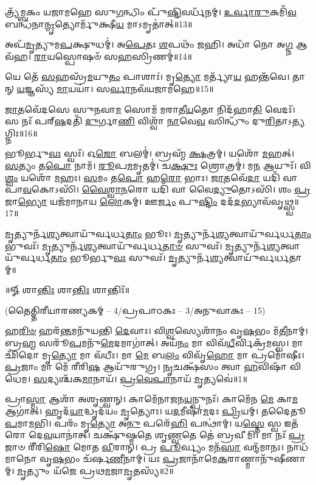 𑌤𑍍𑌰𑍍𑌯᳴𑌮𑍍𑌬𑌕𑌂 𑌯𑌜𑌾𑌮𑌹𑍇 𑌸𑍁\-\ul{𑌗}\-𑌨𑍍𑌧𑌿𑌂 𑌪𑍁᳴\-\ul{𑌷𑍍𑌟𑌿}\-𑌵𑌰𑍍𑌧᳴𑌨𑌮𑍍।
 \ul{𑌉}\-\-\ul{𑌰𑍍𑌵𑌾}\-\-\ul{𑌰𑍁}\-𑌕𑌮𑌿᳴\-\ul{𑌵} 𑌬𑌨𑍍𑌧᳴𑌨𑌾\-\ul{𑌨𑍍𑌮𑍃}\-𑌤𑍍𑌯𑍋𑌰𑍍𑌮𑍁᳴𑌕𑍍𑌷𑍀\-\ul{𑌯} 𑌮𑌾𑌽𑌮𑍃𑌤𑌾॑𑌤𑍍॥13॥

𑌅𑌪᳴\-\ul{𑌮𑍃}\-𑌤𑍍𑌯𑍁𑌮\-\ul{𑌪}\-𑌕𑍍𑌷𑍁𑌧𑌮𑍍॑।   𑌅\-\ul{𑌪𑍇}\-𑌤𑌃 \ul{𑌶}\-𑌪𑌥𑌂᳴ 𑌜𑌹𑌿।
𑌅𑌧𑌾᳴ 𑌨𑍋 𑌅\-\ul{𑌗𑍍𑌨} 𑌆𑌵᳴𑌹।   \ul{𑌰𑌾}\-𑌯𑌸𑍍𑌪𑍋𑌷𑍞᳴ 𑌸\-\ul{𑌹}\-𑌸𑍍𑌰𑌿𑌣𑌮𑍍॑॥14॥

𑌯𑍇 𑌤𑍇᳴ \ul{𑌸}\-𑌹𑌸𑍍𑌰᳴\-\ul{𑌮}\-𑌯𑍁\-\ul{𑌤𑌂} 𑌪𑌾𑌶𑌾𑌃॑।   𑌮𑍃\-\ul{𑌤𑍍𑌯𑍋} 𑌮𑌰𑍍𑌤𑍍𑌯𑌾᳴\-\ul{𑌯} 𑌹𑌨𑍍𑌤᳴𑌵𑍇।
𑌤𑌾𑌨𑍍 \ul{𑌯}\-𑌜𑍍𑌞𑌸𑍍𑌯᳴ \ul{𑌮𑌾}\-𑌯𑌯𑌾॑।   𑌸\-\ul{𑌰𑍍𑌵𑌾}\-𑌨𑌵᳴𑌯𑌜𑌾𑌮𑌹𑍇॥15॥

\-\ul{𑌜𑌾}\-𑌤𑌵𑍇᳴𑌦𑌸𑍇 𑌸𑍁𑌨𑌵𑌾\-\ul{𑌮} 𑌸𑍋𑌮᳴ 𑌮𑌰𑌾𑌤𑍀\-\ul{𑌯}\-𑌤𑍋 𑌨𑌿𑌦᳴𑌹𑌾\-\ul{𑌤𑌿} 𑌵𑍇𑌦𑌃᳴।
𑌸 𑌨𑌃᳴ 𑌪𑌰𑍍‌\-\ul{𑌷}\-𑌦𑌤𑌿᳴ \ul{𑌦𑍁}\-𑌰𑍍𑌗𑌾\-\ul{𑌣𑌿} 𑌵𑌿𑌶𑍍𑌵𑌾᳴ \ul{𑌨𑌾}\-𑌵𑍇\-\ul{𑌵} 𑌸𑌿𑌨𑍍𑌧𑍁𑌂᳴ 𑌦𑍁\-\ul{𑌰𑌿}\-𑌤𑌾𑌽\-\ul{𑌤𑍍𑌯}\-𑌗𑍍𑌨𑌿𑌃॥16॥

𑌭𑍂𑌰𑍍𑌭𑍁\-\ul{𑌵𑌃} 𑌸𑍍𑌵𑌃᳴।
𑌓\-\ul{𑌜𑍋} 𑌬𑌲𑌮𑍍॑।
𑌬𑍍𑌰𑌹𑍍𑌮᳴ \ul{𑌕𑍍𑌷}\-𑌤𑍍𑌰𑌮𑍍।
𑌯𑌶𑍋᳴ \ul{𑌮}\-𑌹𑌤𑍍।
\-\ul{𑌸}\-𑌤𑍍𑌯𑌂 𑌤\-\ul{𑌪𑍋} 𑌨𑌾𑌮᳴।
\-\ul{𑌰𑍂}\-𑌪\-\ul{𑌮}\-𑌮𑍃𑌤𑌮𑍍॑।
𑌚\-\ul{𑌕𑍍𑌷𑍁𑌃} 𑌶𑍍𑌰𑍋𑌤𑍍𑌰𑌮𑍍॑।
𑌮\-\ul{𑌨} 𑌆𑌯𑍁𑌃᳴।
𑌵𑌿\-\ul{𑌶𑍍𑌵𑌂} 𑌯𑌶𑍋᳴ \ul{𑌮}\-𑌹𑌃।
\-\ul{𑌸}\-𑌮𑌂 𑌤\-\ul{𑌪𑍋} 𑌹\-\ul{𑌰𑍋} 𑌭𑌾𑌃।
\-\ul{𑌜𑌾}\-𑌤𑌵𑍇᳴\-\ul{𑌦𑌾} 𑌯𑌦𑌿᳴ 𑌵𑌾 𑌪𑌾\-\ul{𑌵}\-𑌕𑍋𑌽𑌸𑌿᳴।
\-\ul{𑌵𑍈}\-\-\ul{𑌶𑍍𑌵𑌾}\-\-\ul{𑌨}\-𑌰𑍋 𑌯𑌦𑌿᳴ 𑌵𑌾 𑌵𑍈\-\ul{𑌦𑍍𑌯𑍁}\-𑌤𑍋𑌽𑌸𑌿᳴।
𑌶𑌂 \ul{𑌪𑍍𑌰}\-𑌜𑌾\-\ul{𑌭𑍍𑌯𑍋} 𑌯𑌜᳴𑌮𑌾𑌨𑌾𑌯 \ul{𑌲𑍋}\-𑌕𑌮𑍍।
𑌊\-\ul{𑌰𑍍𑌜𑌂} 𑌪𑍁\-\ul{𑌷𑍍𑌟𑌿𑌂} 𑌦𑌦᳴\-\ul{𑌦}\-𑌭𑍍𑌯𑌾𑌵᳴𑌵𑍃𑌥𑍍𑌸𑍍𑌵॥17॥
   
\-\ul{𑌮𑍃}\-𑌤𑍍𑌯𑍁𑌰𑍍𑌨᳴\-\ul{𑌶𑍍𑌯}\-𑌤𑍍𑌵𑌾𑌯𑍁᳴𑌰𑍍𑌵𑌰𑍍𑌧\-\ul{𑌤𑌾𑌂} 𑌭𑍂𑌃।
\-\ul{𑌮𑍃}\-𑌤𑍍𑌯𑍁𑌰𑍍𑌨᳴\-\ul{𑌶𑍍𑌯}\-𑌤𑍍𑌵𑌾𑌯𑍁᳴𑌰𑍍𑌵𑌰𑍍𑌧\-\ul{𑌤𑌾𑌂} 𑌭𑍁𑌵𑌃᳴।
\-\ul{𑌮𑍃}\-𑌤𑍍𑌯𑍁𑌰𑍍𑌨᳴\-\ul{𑌶𑍍𑌯}\-𑌤𑍍𑌵𑌾𑌯𑍁᳴𑌰𑍍𑌵𑌰𑍍𑌧\-\ul{𑌤𑌾}\-\-\ul{𑍞} 𑌸𑍁𑌵𑌃᳴।
\-\ul{𑌮𑍃}\-𑌤𑍍𑌯𑍁𑌰𑍍𑌨᳴\-\ul{𑌶𑍍𑌯}\-𑌤𑍍𑌵𑌾𑌯𑍁᳴𑌰𑍍𑌵𑌰𑍍𑌧\-\ul{𑌤𑌾𑌂} 𑌭𑍂𑌰𑍍𑌭𑍁\-\ul{𑌵𑌃} 𑌸𑍁𑌵𑌃᳴।
\-\ul{𑌮𑍃}\-𑌤𑍍𑌯𑍁𑌰𑍍𑌨᳴\-\ul{𑌶𑍍𑌯}\-𑌤𑍍𑌵𑌾𑌯𑍁᳴𑌰𑍍𑌵𑌰𑍍𑌧𑌤𑌾𑌮𑍍॥

\centerline{॥𑍐 𑌶𑌾\-\ul{𑌨𑍍𑌤𑌿𑌃} 𑌶𑌾\-\ul{𑌨𑍍𑌤𑌿𑌃} 𑌶𑌾𑌨𑍍𑌤𑌿𑌃᳴॥}
\let\parskip\oldparskip

\closesection
\centerline{\scriptsize (𑌤𑍈𑌤𑍍𑌤𑌿𑌰𑍀𑌯𑌾𑌰𑌣𑍍𑌯𑌕𑌮𑍍 – 4/𑌪𑍍𑌰𑌪𑌾𑌠𑌕𑌃 – 3/𑌅𑌨𑍁𑌵𑌾𑌕𑌃 – 15)}
𑌹\-\ul{𑌰𑌿}\-\-\ul{𑍞} 𑌹𑌰᳴\-\ul{𑌨𑍍𑌤}\-𑌮𑌨𑍁᳴𑌯𑌨𑍍𑌤𑌿 \ul{𑌦𑍇}\-𑌵𑌾𑌃। 𑌵𑌿\-\ul{𑌶𑍍𑌵}\-𑌸𑍍𑌯𑍇𑌶𑌾᳴𑌨𑌂 𑌵𑍃\-\ul{𑌷}\-𑌭𑌂 𑌮᳴\-\ul{𑌤𑍀}\-𑌨𑌾𑌮𑍍। 𑌬𑍍𑌰\-\ul{𑌹𑍍𑌮} 𑌸𑌰𑍂᳴\-\ul{𑌪}\-𑌮𑌨𑍁᳴\-\ul{𑌮𑍇}\-𑌦𑌮𑌾𑌗𑌾॑𑌤𑍍। 𑌅𑌯᳴\-\ul{𑌨𑌂} 𑌮𑌾 𑌵𑌿𑌵᳴\-\ul{𑌧𑍀}\-𑌰𑍍𑌵𑌿𑌕𑍍𑌰᳴𑌮𑌸𑍍𑌵। 𑌮𑌾 𑌛𑌿᳴𑌦𑍋 𑌮𑍃\-\ul{𑌤𑍍𑌯𑍋} 𑌮𑌾 𑌵᳴𑌧𑍀𑌃। 𑌮𑌾 \ul{𑌮𑍇} 𑌬\-\ul{𑌲𑌂}  𑌵𑌿𑌵𑍃᳴\-\ul{𑌹𑍋} 𑌮𑌾 𑌪𑍍𑌰𑌮𑍋᳴𑌷𑍀𑌃। \ul{𑌪𑍍𑌰}\-𑌜𑌾𑌂 𑌮𑌾 𑌮𑍇᳴ 𑌰𑍀𑌰𑌿\-\ul{𑌷} 𑌆𑌯𑍁᳴𑌰𑍁𑌗𑍍𑌰। \ul{𑌨𑍃}\-𑌚𑌕𑍍𑌷᳴𑌸𑌂 𑌤𑍍𑌵𑌾 \ul{𑌹}\-𑌵𑌿𑌷𑌾᳴ 𑌵𑌿𑌧𑍇𑌮। \ul{𑌸}\-𑌦𑍍𑌯𑌶𑍍𑌚᳴𑌕\-\ul{𑌮𑌾}\-𑌨𑌾𑌯᳴। \ul{𑌪𑍍𑌰}\-\-\ul{𑌵𑍇}\-\-\ul{𑌪𑌾}\-𑌨𑌾𑌯᳴ \ul{𑌮𑍃}\-𑌤𑍍𑌯𑌵𑍇॑॥1॥

𑌪𑍍𑌰𑌾\-\ul{𑌸𑍍𑌮𑌾} 𑌆𑌶𑌾᳴ 𑌅𑌶𑍃𑌣𑍍𑌵𑌨𑍍। 𑌕𑌾𑌮𑍇᳴𑌨𑌾𑌜𑌨\-\ul{𑌯}\-𑌨𑍍𑌪𑍁𑌨𑌃᳴। 𑌕𑌾𑌮𑍇᳴𑌨 \ul{𑌮𑍇} 𑌕𑌾\-\ul{𑌮} 𑌆𑌗𑌾॑𑌤𑍍। 𑌹𑍃𑌦᳴\-\ul{𑌯𑌾}\-𑌦𑍍𑌧𑍃𑌦᳴𑌯𑌂 \ul{𑌮𑍃}\-𑌤𑍍𑌯𑍋𑌃। 𑌯\-\ul{𑌦}\-𑌮𑍀𑌷𑌾᳴\-\ul{𑌮}\-𑌦𑌃 \ul{𑌪𑍍𑌰𑌿}\-𑌯𑌮𑍍। 𑌤𑌦𑍈𑌤𑍂\-\ul{𑌪}\-𑌮𑌾\-\ul{𑌮}\-𑌭𑌿। 𑌪𑌰𑌂᳴ 𑌮𑍃\-\ul{𑌤𑍍𑌯𑍋} 𑌅\-\ul{𑌨𑍁} 𑌪𑌰𑍇᳴\-\ul{𑌹𑌿} 𑌪𑌨𑍍𑌥𑌾॑𑌮𑍍। 𑌯\-\ul{𑌸𑍍𑌤𑍇} 𑌸𑍍𑌵 𑌇𑌤᳴𑌰𑍋 𑌦𑍇\-\ul{𑌵}\-𑌯𑌾𑌨𑌾॑𑌤𑍍। 𑌚𑌕𑍍𑌷𑍁᳴𑌷𑍍𑌮𑌤𑍇 𑌶𑍃\-\ul{𑌣𑍍𑌵}\-𑌤𑍇 𑌤𑍇॑ 𑌬𑍍𑌰𑌵𑍀𑌮𑌿। 𑌮𑌾 𑌨𑌃᳴ \ul{𑌪𑍍𑌰}\-𑌜𑌾𑍞 𑌰𑍀᳴𑌰𑌿\-\ul{𑌷𑍋} 𑌮𑍋𑌤 \ul{𑌵𑍀}\-𑌰𑌾𑌨𑍍। 𑌪𑍍𑌰 \ul{𑌪𑍂}\-𑌰𑍍𑌵𑍍𑌯𑌂 𑌮𑌨᳴\-\ul{𑌸𑌾} 𑌵𑌨𑍍𑌦᳴𑌮𑌾𑌨𑌃। 𑌨𑌾𑌧᳴𑌮𑌾𑌨𑍋 𑌵𑍃\-\ul{𑌷}\-𑌭𑌂 𑌚᳴𑌰𑍍\mbox{}𑌷\-\ul{𑌣𑍀}\-𑌨𑌾𑌮𑍍। 𑌯𑌃 \ul{𑌪𑍍𑌰}\-𑌜𑌾𑌨𑌾᳴𑌮𑍇\-\ul{𑌕}\-𑌰𑌾𑌣𑍍𑌮𑌾𑌨𑍁᳴𑌷𑍀𑌣𑌾𑌮𑍍। \ul{𑌮𑍃}\-𑌤𑍍𑌯𑍁𑌂 𑌯᳴𑌜𑍇 𑌪𑍍𑌰𑌥\-\ul{𑌮}\-𑌜𑌾\-\ul{𑌮𑍃}\-𑌤𑌸𑍍𑌯᳴॥2॥
